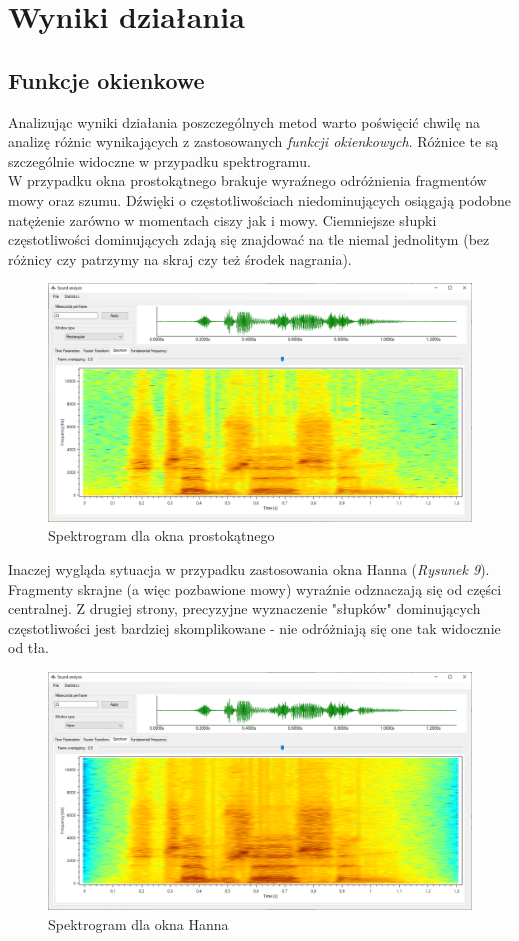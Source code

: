 \documentclass[a4paper]{article}
\begin{document}
\section{Wyniki działania}
\subsection{Funkcje okienkowe}
Analizując wyniki działania poszczególnych metod warto poświęcić chwilę na analizę różnic wynikających z zastosowanych \textit{funkcji okienkowych}. Różnice te są szczególnie widoczne w przypadku spektrogramu.\\
W przypadku okna prostokątnego brakuje wyraźnego odróżnienia fragmentów mowy oraz szumu. Dźwięki o częstotliwościach niedominujących osiągają podobne natężenie zarówno w momentach ciszy jak i mowy. Ciemniejsze słupki częstotliwości dominujących zdają się znajdować na tle niemal jednolitym (bez różnicy czy patrzymy na skraj czy też środek nagrania).
\begin{figure}[H]
  \centering  
  \includegraphics[width=0.86\linewidth]{images/08rectangularWindow.png}
  \caption{Spektrogram dla okna prostokątnego}
\end{figure}
Inaczej wygląda sytuacja w przypadku zastosowania okna Hanna (\textit{Rysunek 9}).\\
Fragmenty skrajne (a więc pozbawione mowy) wyraźnie odznaczają się od części centralnej. Z drugiej strony, precyzyjne wyznaczenie "słupków" dominujących częstotliwości jest bardziej skomplikowane - nie odróżniają się one tak widocznie od tła.
\begin{figure}[H]
  \centering
  \includegraphics[width=0.86\linewidth]{images/09hannWindow.png}
  \caption{Spektrogram dla okna Hanna}
\end{figure}
\end{document}
